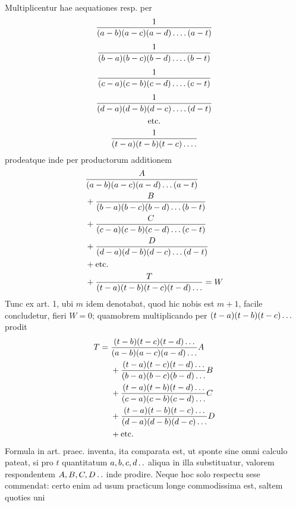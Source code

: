 \par
\begingroup
\renewcommand{\arraystretch}{1.45}
Multiplicentur hae aequationes resp. per
\[
\begin{gathered}
\frac{1}{(a-b)(a-c)(a-d)\mathinner{.\,.\,.\,.}(a-t)}\\[4pt]
\frac{1}{(b-a)(b-c)(b-d)\mathinner{.\,.\,.\,.}(b-t)}\\[4pt]
\frac{1}{(c-a)(c-b)(c-d)\mathinner{.\,.\,.\,.}(c-t)}\\[4pt]
\frac{1}{(d-a)(d-b)(d-c)\mathinner{.\,.\,.\,.}(d-t)}\\
\text{etc.}\\
\frac{1}{(t-a)(t-b)(t-c)\mathinner{.\,.\,.\,.}}
\end{gathered}
\]
prodeatque inde per productorum additionem
\[
\begin{aligned}
&\frac{A}{(a-b)(a-c)(a-d)\mathinner{.\,.\,.}(a-t)}\\
&{}+\frac{B}{(b-a)(b-c)(b-d)\mathinner{.\,.\,.}(b-t)}\\
&{}+\frac{C}{(c-a)(c-b)(c-d)\mathinner{.\,.\,.}(c-t)}\\
&{}+\frac{D}{(d-a)(d-b)(d-c)\mathinner{.\,.\,.}(d-t)}\\
&{}+\text{etc.}\\
&{}+\frac{T}{(t-a)(t-b)(t-c)(t-d)\mathinner{.\,.\,.}}=W
\end{aligned}
\]
Tunc ex art. 1, ubi $m$ idem denotabat, quod hic nobis est $m+1$, facile concludetur, fieri $W=0$; quamobrem multiplicando per $(t-a)(t-b)(t-c)\mathinner{.\,.\,.}$ prodit
\[
\begin{aligned}
T={}&\frac{(t-b)(t-c)(t-d)\mathinner{.\,.\,.}}{(a-b)(a-c)(a-d)\mathinner{.\,.\,.}}A\\
&{}+\frac{(t-a)(t-c)(t-d)\mathinner{.\,.\,.}}{(b-a)(b-c)(b-d)\mathinner{.\,.\,.}}B\\
&{}+\frac{(t-a)(t-b)(t-d)\mathinner{.\,.\,.}}{(c-a)(c-b)(c-d)\mathinner{.\,.\,.}}C\\
&{}+\frac{(t-a)(t-b)(t-c)\mathinner{.\,.\,.}}{(d-a)(d-b)(d-c)\mathinner{.\,.\,.}}D\\
&{}+\text{etc.}
\end{aligned}
\]
Formula in art. praec. inventa, ita comparata est, ut sponte sine omni calculo pateat, si pro $t$ quantitatum $a,b,c,d\mathinner{.\,.}$ aliqua in illa substituatur, valorem
respondentem $A,B,C,D\mathinner{.\,.}$ inde prodire. Neque hoc solo respectu sese commendat: certo enim ad usum practicum longe commodissima est, saltem quoties uni%
